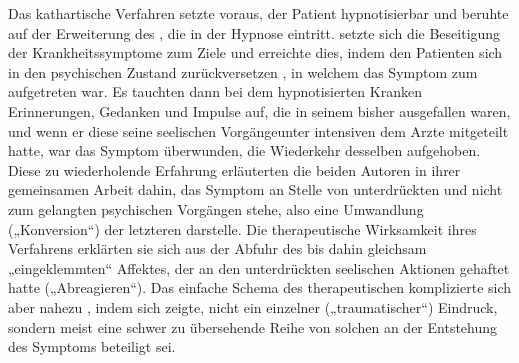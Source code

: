 \documentclass[twoside=true,titlepage=false,open=any, parskip=never, fontsize=10pt, headings=small, chapterprefix=false, appendixprefix=false]{scrbook}
\begin{document}
            
        \pstart
        Das kathartische Verfahren setzte voraus,  der Patient hypnotisierbar und beruhte auf der Erweiterung des , die in der Hypnose eintritt.  setzte sich die Beseitigung der Krankheitssymptome zum Ziele und
               erreichte dies, indem  den Patienten sich in den psychischen Zustand zurückversetzen , in welchem das Symptom zum  aufgetreten war. Es tauchten dann bei dem hypnotisierten Kranken
               Erinnerungen, Gedanken und Impulse auf, die in seinem  bisher ausgefallen waren, und wenn er diese seine seelischen Vorgängeunter intensiven  dem Arzte mitgeteilt hatte, war das Symptom überwunden, die Wiederkehr
               desselben aufgehoben. Diese  zu wiederholende Erfahrung erläuterten die beiden Autoren in ihrer
               gemeinsamen Arbeit dahin,  das Symptom an Stelle von unterdrückten und nicht zum  gelangten psychischen Vorgängen stehe, also eine Umwandlung
               („Konversion“) der letzteren darstelle. Die therapeutische Wirksamkeit ihres Verfahrens erklärten sie sich aus der Abfuhr des bis dahin gleichsam „eingeklemmten“ Affektes, der an den
                  unterdrückten seelischen Aktionen gehaftet hatte („Abreagieren“).
               Das einfache Schema des therapeutischen komplizierte sich aber nahezu , indem sich zeigte,  nicht ein einzelner („traumatischer“) Eindruck, sondern meist eine schwer
               zu übersehende Reihe von solchen an der Entstehung des Symptoms
               beteiligt sei.
        \pend
    
\end{document}
